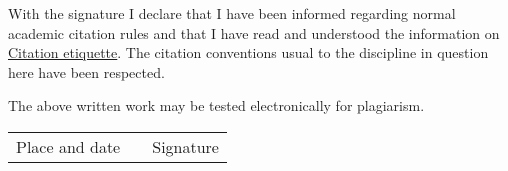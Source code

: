 With the signature I declare that I have been informed regarding normal academic citation rules and that I have read and understood the information on \href{https://www.ethz.ch/content/dam/ethz/main/education/rechtliches-abschluesse/leistungskontrollen/plagiarism-citationetiquette.pdf}{Citation etiquette}.
The citation conventions usual to the discipline in question here have been respected.

\vspace{0.5cm}

The above written work may be tested electronically for plagiarism.

\vspace{4cm}

\begin{tabular}{ p{5cm} p{1cm} p{5cm} }
  \cline{1-1} \cline{3-3}
  Place and date & & Signature \\
\end{tabular}

\setlength{\parindent}{\oldparindent}